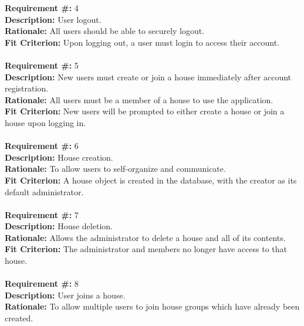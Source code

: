 \documentclass[12pt]{article}
\begin{document}
\textbf{Requirement \#:} 4
       \\
      \textbf{Description: }{User logout.} \\
      \textbf{Rationale: }{All users should be able to securely logout.} \\
      \textbf{Fit Criterion: }{Upon logging out, a user must login to access their account.} \\ \\
\textbf{Requirement \#:} 5
       \\
      \textbf{Description: }{New users must create or join a house immediately after account registration.} \\
      \textbf{Rationale: }{All users must be a member of a house to use the application.} \\
      \textbf{Fit Criterion: }{New users will be prompted to either create a house or join a house upon logging in.} \\ \\
\textbf{Requirement \#:} 6
       \\
      \textbf{Description:} House creation. \\
      \textbf{Rationale:} To allow users to self-organize and communicate. \\
      \textbf{Fit Criterion:} A house object is created in the database, with
      the creator as its default administrator. \\ \\  
\textbf{Requirement \#:} 7
       \\
      \textbf{Description:} House deletion. \\
      \textbf{Rationale:} Allows the administrator to delete a house and all of its contents. \\
      \textbf{Fit Criterion:} The administrator and members no longer have access to that house. \\ \\  
\textbf{Requirement \#:} 8
       \\
      \textbf{Description:} User joins a house. \\
      \textbf{Rationale:} To allow multiple users to join house groups which
      have already been created. \\
\end{document}
